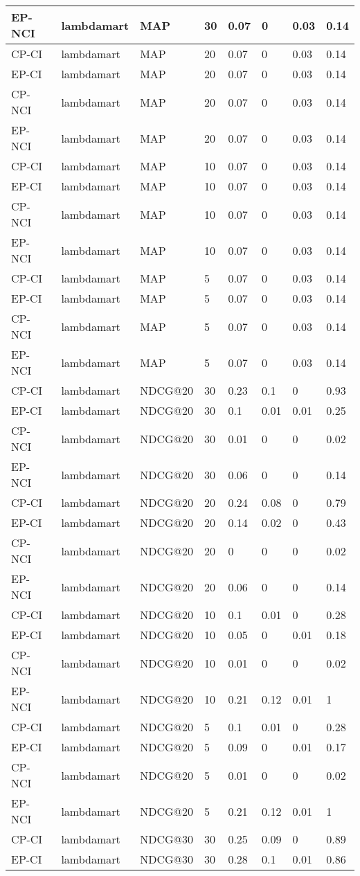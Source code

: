 \begin{landscape}
\begin{longtable}{|*{8}{l|}}
EP-NCI&lambdamart&MAP&30&0.07&0&0.03&0.14\\
\hline
CP-CI&lambdamart&MAP&20&0.07&0&0.03&0.14\\
EP-CI&lambdamart&MAP&20&0.07&0&0.03&0.14\\
CP-NCI&lambdamart&MAP&20&0.07&0&0.03&0.14\\
EP-NCI&lambdamart&MAP&20&0.07&0&0.03&0.14\\
\hline
CP-CI&lambdamart&MAP&10&0.07&0&0.03&0.14\\
EP-CI&lambdamart&MAP&10&0.07&0&0.03&0.14\\
CP-NCI&lambdamart&MAP&10&0.07&0&0.03&0.14\\
EP-NCI&lambdamart&MAP&10&0.07&0&0.03&0.14\\
\hline
CP-CI&lambdamart&MAP&5&0.07&0&0.03&0.14\\
EP-CI&lambdamart&MAP&5&0.07&0&0.03&0.14\\
CP-NCI&lambdamart&MAP&5&0.07&0&0.03&0.14\\
EP-NCI&lambdamart&MAP&5&0.07&0&0.03&0.14\\
\hline
CP-CI&lambdamart&NDCG@20&30&0.23&0.1&0&0.93\\
EP-CI&lambdamart&NDCG@20&30&0.1&0.01&0.01&0.25\\
CP-NCI&lambdamart&NDCG@20&30&0.01&0&0&0.02\\
EP-NCI&lambdamart&NDCG@20&30&0.06&0&0&0.14\\
\hline
CP-CI&lambdamart&NDCG@20&20&0.24&0.08&0&0.79\\
EP-CI&lambdamart&NDCG@20&20&0.14&0.02&0&0.43\\
CP-NCI&lambdamart&NDCG@20&20&0&0&0&0.02\\
EP-NCI&lambdamart&NDCG@20&20&0.06&0&0&0.14\\
\hline
CP-CI&lambdamart&NDCG@20&10&0.1&0.01&0&0.28\\
EP-CI&lambdamart&NDCG@20&10&0.05&0&0.01&0.18\\
CP-NCI&lambdamart&NDCG@20&10&0.01&0&0&0.02\\
EP-NCI&lambdamart&NDCG@20&10&0.21&0.12&0.01&1\\
\hline
CP-CI&lambdamart&NDCG@20&5&0.1&0.01&0&0.28\\
EP-CI&lambdamart&NDCG@20&5&0.09&0&0.01&0.17\\
CP-NCI&lambdamart&NDCG@20&5&0.01&0&0&0.02\\
EP-NCI&lambdamart&NDCG@20&5&0.21&0.12&0.01&1\\
\hline
CP-CI&lambdamart&NDCG@30&30&0.25&0.09&0&0.89\\
EP-CI&lambdamart&NDCG@30&30&0.28&0.1&0.01&0.86\\

\end{longtable}
\end{landscape}
